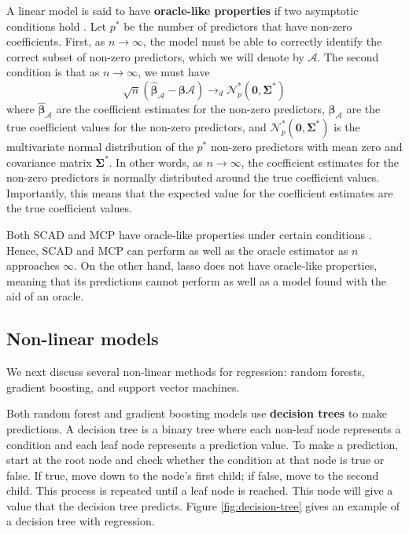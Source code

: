 \documentclass{article}
\begin{document}
	A linear model is said to have \textbf{oracle-like properties} if two asymptotic conditions hold \cite{zou2006adaptive}. Let $p^\ast$ be the number of predictors that have non-zero coefficients. First, as $n\to \infty$, the model must be able to correctly identify the correct subset of non-zero predictors, which we will denote by $\mathcal{A}$. The second condition is that as $n\to\infty$, we must have
	\begin{equation}
		\sqrt{n}(\hat{\bm{\beta}}_\mathcal{A} - \bm{\beta}\mathcal{A})\to_d \mathcal{N}_p^{\ast}(\mathbf{0}, \mathbf{\Sigma}^\ast)
	\end{equation}
	where $\hat{\bm{\beta}}_\mathcal{A}$ are the coefficient estimates for the non-zero predictors, $\bm{\beta}_\mathcal{A}$ are the true coefficient values for the non-zero predictors, and $\mathcal{N}_p^\ast(\mathbf{0}, \mathbf{\Sigma}^\ast)$ is the multivariate normal distribution of the $p^\ast$ non-zero predictors with mean zero and covariance matrix $\mathbf{\Sigma}^\ast$. In other words, as $n\to\infty$, the coefficient estimates for the non-zero predictors is normally distributed around the true coefficient values. Importantly, this means that the expected value for the coefficient estimates are the true coefficient values.
	
	Both SCAD and MCP have oracle-like properties under certain conditions \cite{fan2001variable, zhang2010nearly}. Hence, SCAD and MCP can perform as well as the oracle estimator as $n$ approaches $\infty$. On the other hand, lasso does not have oracle-like properties, meaning that its predictions cannot perform as well as a model found with the aid of an oracle.
	
	\subsection{Non-linear models}
	We next discuss several non-linear methods for regression: random forests, gradient boosting, and support vector machines.
	
	Both random forest and gradient boosting models use \textbf{decision trees} to make predictions. A decision tree is a binary tree where each non-leaf node represents a condition and each leaf node represents a prediction value. To make a prediction, start at the root node and check whether the condition at that node is true or false. If true, move down to the node's first child; if false, move to the second child. This process is repeated until a leaf node is reached. This node will give a value that the decision tree predicts. Figure \ref{fig:decision-tree} gives an example of a decision tree with regression.
	
\end{document}
